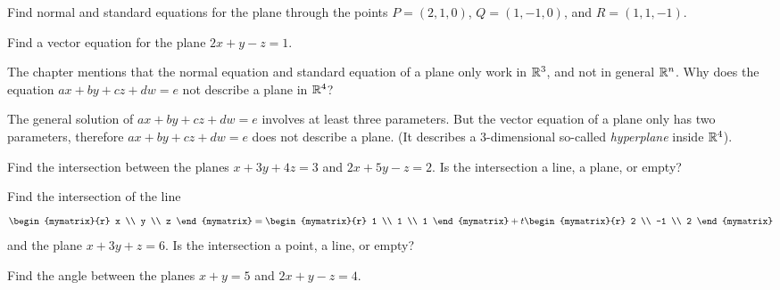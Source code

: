\begin{ex}
  Find normal and standard equations for the plane through the points
  $P = (2,1,0)$, $Q=(1,-1,0)$, and $R=(1,1,-1)$.
\end{ex}

\begin{ex}
  Find a vector equation for the plane $2x+y-z=1$.
\end{ex}

\begin{ex}
  The chapter mentions that the normal equation and standard equation
  of a plane only work in $\mathbb{R}^3$, and not in general $\mathbb{R}^n$. Why does
  the equation $ax+by+cz+dw=e$ not describe a plane in $\mathbb{R}^4$?
  \begin{sol}
    The general solution of $ax+by+cz+dw=e$ involves at least three
    parameters.  But the vector equation of a plane only has two
    parameters, therefore $ax+by+cz+dw=e$ does not describe a
    plane. (It describes a $3$-dimensional so-called {\em
      hyperplane}%
     inside
    $\mathbb{R}^4$).
  \end{sol}
\end{ex}

\begin{ex}
  Find the intersection between the planes $x+3y+4z=3$ and $2x+5y-z=2$.
  Is the intersection a line, a plane, or empty?
\end{ex}

\begin{ex}
  Find the intersection of the line
  \begin{equation*}
    \begin{mymatrix}{r} x \\ y \\ z \end{mymatrix}
    = \begin{mymatrix}{r} 1 \\ 1 \\ 1 \end{mymatrix}
    + t \begin{mymatrix}{r} 2 \\ -1 \\ 2 \end{mymatrix}
  \end{equation*}
  and the plane $x+3y+z = 6$.
  Is the intersection a point, a line, or empty?
\end{ex}

\begin{ex}
  Find the angle between the planes $x+y=5$ and $2x+y-z=4$.
\end{ex}

